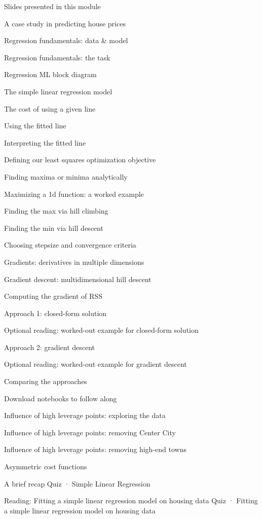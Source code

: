 \item Slides presented in this module
\item A case study in predicting house prices
\item Regression fundamentals: data & model
\item Regression fundamentals: the task
\item Regression ML block diagram
\item The simple linear regression model
\item The cost of using a given line
\item Using the fitted line
\item Interpreting the fitted line
\item Defining our least squares optimization objective
\item Finding maxima or minima analytically
\item Maximizing a 1d function: a worked example
\item Finding the max via hill climbing
\item Finding the min via hill descent
\item Choosing stepsize and convergence criteria
\item Gradients: derivatives in multiple dimensions
\item Gradient descent: multidimensional hill descent
\item Computing the gradient of RSS
\item Approach 1: closed-form solution
\item Optional reading: worked-out example for closed-form solution
\item Approach 2: gradient descent
\item Optional reading: worked-out example for gradient descent
\item Comparing the approaches
\item Download notebooks to follow along
\item Influence of high leverage points: exploring the data
\item Influence of high leverage points: removing Center City
\item Influence of high leverage points: removing high-end towns
\item Asymmetric cost functions
\item A brief recap
Quiz · Simple Linear Regression
\item Reading: Fitting a simple linear regression model on housing data
Quiz · Fitting a simple linear regression model on housing data
